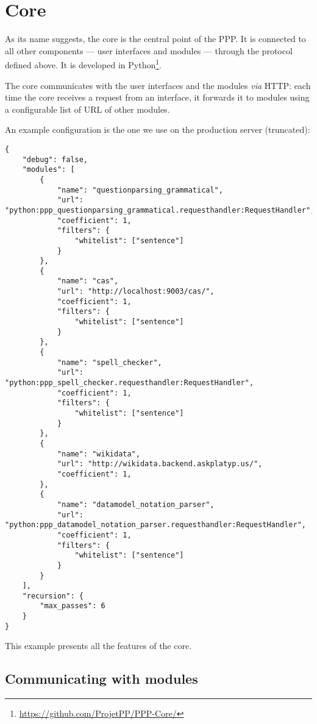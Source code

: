 \section{Core}

As its name suggests, the core is the central point of the PPP. It is
connected to all other components — user interfaces and modules — through
the protocol defined above. It is developed in Python\footnote{\url{https://github.com/ProjetPP/PPP-Core/}}.

The core communicates with the user interfaces and the modules {\em via} HTTP:
each time the core receives a request from an interface, it forwards it
to modules using a configurable list of URL of other modules.

An example configuration is the one we use on the production server
(truncated):

\begin{verbatim}
{
    "debug": false,
    "modules": [
        {
            "name": "questionparsing_grammatical",
            "url": "python:ppp_questionparsing_grammatical.requesthandler:RequestHandler",
            "coefficient": 1,
            "filters": {
                "whitelist": ["sentence"]
            }
        },
        {
            "name": "cas",
            "url": "http://localhost:9003/cas/",
            "coefficient": 1,
            "filters": {
                "whitelist": ["sentence"]
            }
        },
        {
            "name": "spell_checker",
            "url": "python:ppp_spell_checker.requesthandler:RequestHandler",
            "coefficient": 1,
            "filters": {
                "whitelist": ["sentence"]
            }
        },
        {
            "name": "wikidata",
            "url": "http://wikidata.backend.askplatyp.us/",
            "coefficient": 1,
        },
        {
            "name": "datamodel_notation_parser",
            "url": "python:ppp_datamodel_notation_parser.requesthandler:RequestHandler",
            "coefficient": 1,
            "filters": {
                "whitelist": ["sentence"]
            }
        }
    ],
    "recursion": {
        "max_passes": 6
    }
}
\end{verbatim}

This example presents all the features of the core.

\subsection{Communicating with modules}

